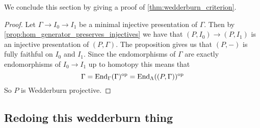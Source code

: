 We conclude this section by giving a proof of \cref{thm:wedderburn_criterion}.

\Wederburncriterion*
\begin{proof}
	Let $\Gamma \to I_0 \to I_1$ be a minimal injective presentation of $\Gamma$. Then by \cref{prop:hom_generator_preserves_injectives} we have that $(P, I_0) \to (P,I_1)$ is an injective presentation of $(P,\Gamma)$. The proposition gives us that $(P,-)$ is fully faithful on $I_0$ and $I_1$. Since the endomorphisms of $\Gamma$ are exactly endomorphisms of $I_0 \to I_1$ up to homotopy this means that $$\Gamma=\operatorname{End}_\Gamma(\Gamma)^{\operatorname{op}} = \operatorname{End}_\Lambda((P, \Gamma))^{\operatorname{op}}$$
	So $P$ is Wedderburn projective.
\end{proof}

\subsection{Redoing this wedderburn thing}

